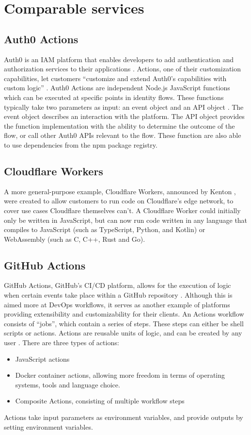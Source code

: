\section{Comparable services}
\subsection{Auth0 Actions}
Auth0 is an IAM platform that enables developers to add authentication and authorization services to their applications \autocite{Auth0Overview}. Actions, one of their customization capabilities, let customers ``customize and extend Auth0's capabilities with custom logic'' \autocite{Auth0Actions}. Auth0 Actions are independent Node.js JavaScript functions which can be executed at specific points in identity flows. These functions typically take two parameters as input: an event object and an API object \autocite{Auth0Triggers}. The event object describes an interaction with the platform. The API object provides the function implementation with the ability to determine the outcome of the flow, or call other Auth0 APIs relevant to the flow. These function are also able to use dependencies from the npm package registry.


\subsection{Cloudflare Workers}
A more general-purpose example, Cloudflare Workers, announced by Kenton \textcite{Varda2017}, were created to allow customers to run code on Cloudflare's edge network, to cover use cases Cloudflare themselves can't. A Cloudflare Worker could initially only be written in JavaScript, but can now run code written in any language that compiles to JavaScript (such as TypeScript, Python, and Kotlin) or WebAssembly (such as C, C++, Rust and Go). \autocite{Varda2018, Koeninger2020}

\subsection{GitHub Actions}
GitHub Actions, GitHub's CI/CD platform, allows for the execution of logic when certain events take place within a GitHub repository \autocite{GitHubActions}. Although this is aimed more at DevOps workflows, it serves as another example of platforms providing extensibility and customizability for their clients. An Actions workflow consists of ``jobs'', which contain a series of steps. These steps can either be shell scripts or actions. Actions are reusable units of logic, and can be created by any user \autocite{GitHubCustomActions}. There are three types of actions:
\begin{itemize}
    \item{JavaScript actions} 
    \item{Docker container actions, allowing more freedom in terms of operating systems, tools and language choice.}
    \item{Composite Actions, consisting of multiple workflow steps}
\end{itemize}
Actions take input parameters as environment variables, and provide outputs by setting environment variables. 
